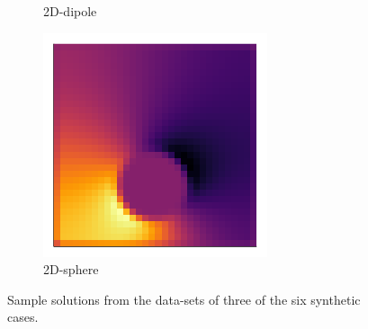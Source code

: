 \documentclass[review]{elsarticle}
\begin{document}
\begin{figure}
\begin{subfigure}[b]{0.3\textwidth}
        \caption{2D-dipole}
        \label{fig:2D-mu}
    \end{subfigure}
    \begin{subfigure}[b]{0.3\textwidth}
        \centering
        \includegraphics[width=\textwidth]{figures/2D-sphere.png}
        \caption{2D-sphere}
        \label{fig:2D-sphere}
    \end{subfigure}
    \caption{Sample solutions from the data-sets of three of the six synthetic cases.}
    \label{fig:synthetic cases}
\end{figure}
\end{document}
